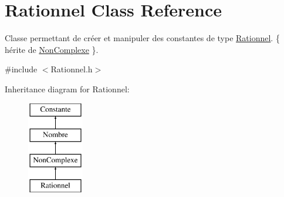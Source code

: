 \hypertarget{classRationnel}{\section{\-Rationnel \-Class \-Reference}
\label{classRationnel}
}


\-Classe permettant de créer et manipuler des constantes de type \hyperlink{classRationnel}{\-Rationnel}. \{ hérite de \hyperlink{classNonComplexe}{\-Non\-Complexe} \}.  




{\ttfamily \#include $<$\-Rationnel.\-h$>$}

\-Inheritance diagram for \-Rationnel\-:\begin{figure}[H]
\begin{center}
\leavevmode
\includegraphics[height=4.000000cm]{classRationnel}
\end{center}
\end{figure}
